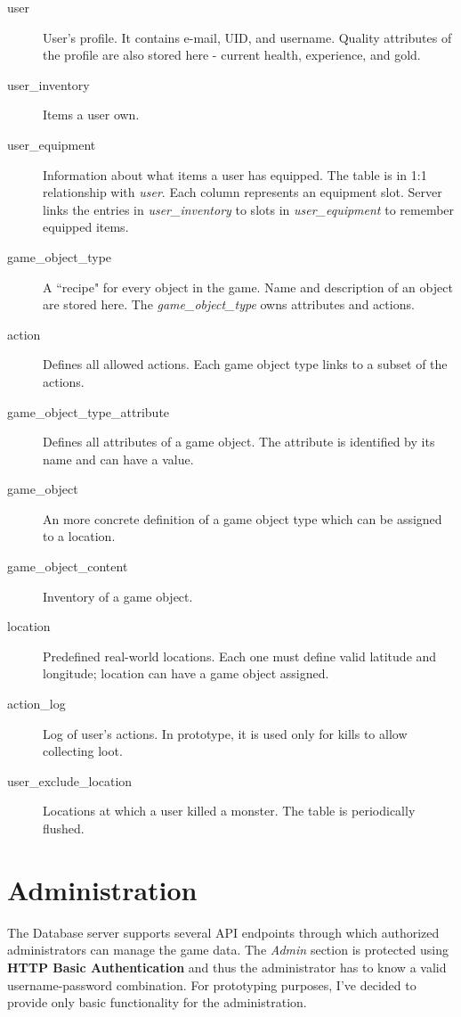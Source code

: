 	\begin{description}
		\item[user] User's profile. It contains e-mail, UID, and username. Quality attributes of the profile are also stored here - current health, experience, and gold.
		
		\item[user\_inventory] Items a user own. 
		
		\item[user\_equipment] Information about what items a user has equipped. The table is in 1:1 relationship with \textit{user}. Each column represents an equipment slot. Server links the entries in \textit{user\_inventory} to slots in \textit{user\_equipment} to remember equipped items.
		
		\item[game\_object\_type] A ``recipe" for every object in the game. Name and description of an object are stored here. The \textit{game\_object\_type} owns attributes and actions.
	
		\item[action] Defines all allowed actions. Each game object type links to a subset of the actions.
		
		\item[game\_object\_type\_attribute] Defines all attributes of a game object. The attribute is identified by its name and can have a value.
	
		\item[game\_object] An more concrete definition of a game object type which can be assigned to a location.
	
		\item[game\_object\_content] Inventory of a game object.
	
		\item[location] Predefined real-world locations. Each one must define valid latitude and longitude; location can have a game object assigned. 
	
		\item[action\_log] Log of user's actions. In prototype, it is used only for kills to allow collecting loot.

		\item[user\_exclude\_location] Locations at which a user killed a monster. The table is periodically flushed. 
		
	\end{description}

\section{Administration}
The Database server supports several API endpoints through which authorized administrators can manage the game data. The \textit{Admin} section is protected using \textbf{HTTP Basic Authentication} and thus the administrator has to know a valid username-password combination. For prototyping purposes, I've decided to provide only basic functionality for the administration.

